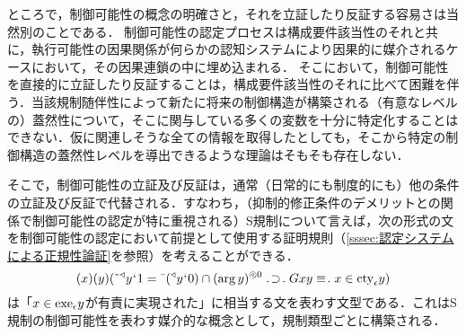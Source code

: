 ところで，制御可能性の概念の明確さと，それを立証したり反証する容易さは当然別のことである．
制御可能性の認定プロセスは構成要件該当性のそれと共に，執行可能性の因果関係が何らかの認知システムにより因果的に媒介されるケースにおいて，その因果連鎖の中に埋め込まれる．
そこにおいて，制御可能性を直接的に立証したり反証することは，構成要件該当性のそれに比べて困難を伴う．当該規制随伴性によって新たに将来の制御構造が構築される（有意なレベルの）蓋然性について，そこに関与している多くの変数を十分に特定化することはできない．仮に関連しそうな全ての情報を取得したとしても，そこから特定の制御構造の蓋然性レベルを導出できるような理論はそもそも存在しない．

そこで，制御可能性の立証及び反証は，通常（日常的にも制度的にも）他の条件の立証及び反証で代替される．すなわち，（抑制的修正条件のデメリットとの関係で制御可能性の認定が特に重視される）S規制について言えば，次の形式の文を制御可能性の認定において前提として使用する証明規則（\ref{sssec:認定システムによる正規性論証}を参照）を考えることができる．
\[
    (x)(y)(\tildel{\trgl{y}}\fap 1 = \barl{(\trgl{y}\fap 0)}\cap\msec{(\arg y)}{0}\case{1}{1}{1}Gxy\case{3}{0}{1}x\in \cty{\epsilon}y)
\]
は「$ x\in\mathrm{exe}_{\epsilon} y $が有責に実現された」に相当する文を表わす文型である．これはS規制の制御可能性を表わす媒介的な概念として，規制類型ごとに構築される．

